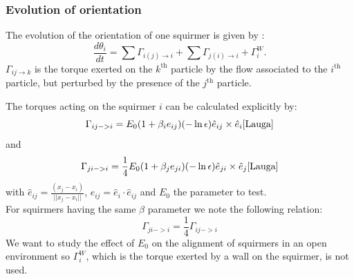 \documentclass{article}
\begin{document}
\subsubsection{Evolution of orientation}
The evolution of the orientation of one squirmer is given by : 
$$
\frac{d \theta_i}{dt} = \sum \Gamma_{i(j)\rightarrow i} + \sum \Gamma_{j(i)\rightarrow i} +  \Gamma_{i}^W.
$$
$\Gamma_{ij\rightarrow k}$ is the torque exerted on the $k^\mathrm{th}$ particle by the flow associated to the $i^\mathrm{th}$ particle, but perturbed by the presence of the $j^\mathrm{th}$ particle.\\

\vspace{0.5cm}

The torques acting on the squirmer $i$ can be calculated explicitly by: \\
$$
\Gamma_{ij->i} = E_0(1 + \beta_i e_{ij})(-\ln\epsilon)\hat{e}_{ij}\times \hat{e}_i \cite{Lauga}
$$
and
$$
\Gamma_{ji->i} = \frac{1}{4}E_0(1 + \beta_j e_{ji})(-\ln\epsilon)\hat{e}_{ji}\times \hat{e}_j \cite{Lauga}
$$
with $\hat{e}_{ij} = \frac{(x_j - x_i)}{||x_j - x_i||}$, $e_{ij} = \hat{e}_i\cdot \hat{e}_{ij}$ and $E_0$ the parameter to test.\\ 
For squirmers having the same $\beta$ parameter we note the following relation:
$$
\Gamma_{ji->i} = \frac{1}{4}\Gamma_{ij->i}
$$
We want to study the effect of $E_0$ on the alignment of squirmers in an open environment so $\Gamma_{i}^W$, which is the torque 
exerted by a wall on the squirmer, is not used.
\end{document}
